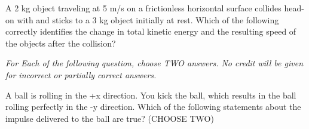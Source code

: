 \documentclass[10pt]{examdesign}
\begin{document}
\begin{multiplechoice} [title={Multiple Choice},
	rearrange=no]
\begin{question}
\end{question}



\begin{question}
A 2 kg object traveling at 5 m/s on a frictionless horizontal surface collides head-on with and sticks to a 3 kg object initially at rest. Which of the following correctly identifies the change in total kinetic energy and the resulting speed of the objects after the collision?

	
\end{question}


\end{multiplechoice} 

\begin{multiplechoice} [title={Multiple Correct Multiple Choice},
	rearrange=no] \textit{For Each of the following question, choose TWO answers.  No credit will be given for incorrect or partially correct answers.}
	
	\begin{question}
		A ball is rolling in the +x direction.  You kick the ball, which results in the ball rolling perfectly in the -y direction.  Which of the following statements about the impulse delivered to the ball are true? (CHOOSE TWO)
		\end{question}
	
	\end{multiplechoice}
\end{document}
